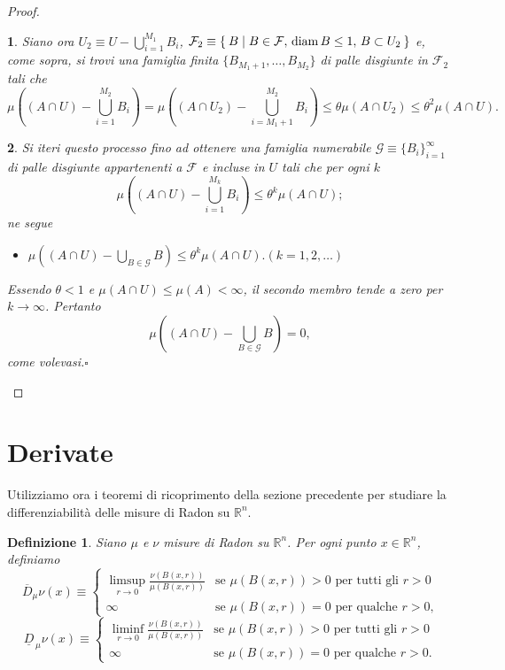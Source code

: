 \documentclass[a4paper,10pt,openright,oneside]{book}
\theoremstyle{theoremstyle}
\theoremstyle{theoremstylewoheader}
\theoremstyle{theoremstyle}
\newtheorem{definizione}[teorema]{Definizione}
\theoremstyle{proofsecstyle}
\newtheorem{proofsec}{}
\theoremstyle{nonumberplain}
\newtheorem{proof}{Dim.}
\newcommand{\FF}{\ensuremath{\mathcal{F}}}
\newcommand{\GG}{\ensuremath{\mathcal{G}}}
\newcommand{\RR}{\ensuremath{\mathbb{R}}}
\newcommand{\lDer}[2]{\ensuremath{\underline{D}_{\,#2} #1}}
\newcommand{\uDer}[2]{\ensuremath{\overline{D}_#2 #1}}
\DeclareMathOperator{\diam}{diam}
\renewcommand{\qedsymbol}{\ensuremath{\square}}
\newcommand{\qed}{\unskip\nobreak\hfill\nobreak\hspace{.5em}\qedsymbol}
\newcommand{\mymath}[2]{\begin{itemize}%
  \item[]\hfill\hbox{}\ensuremath{\displaystyle #1}\hfill\ensuremath{\displaystyle #2}%
  \end{itemize}}
\begin{document}
\begin{proof}
\begin{proofsec}
Siano ora $U_2 \equiv U - \bigcup_{i=1}^{M_1} B_i$, $\FF_2 \equiv \Set{ B | B \in \FF,\, \diam B \le 1,\, B \subset U_2 }$ e, come sopra, si trovi una famiglia finita $\{B_{M_1 + 1}, \ldots, B_{M_2}\}$ di palle disgiunte in $\FF_2$ tali che
\[
\mu\left((A \cap U) - \bigcup_{i=1}^{M_2} B_i\right) = \mu\left((A \cap U_2) - \bigcup_{i=M_1 + 1}^{M_2} B_i\right) \le \theta\mu(A \cap U_2) \le \theta^2\mu(A \cap U).
\]
\end{proofsec}

\begin{proofsec}
Si iteri questo processo fino ad ottenere una famiglia numerabile $\GG \equiv \{B_i\}_{i=1}^\infty$ di palle disgiunte appartenenti a $\FF$ e incluse in $U$ tali che per ogni $k$
\[
\mu\left((A \cap U) - \bigcup_{i=1}^{M_k} B_i\right) \le \theta^k\mu(A \cap U);
\]
ne segue \mymath{\mu\left((A \cap U) - \bigcup_{B \in \GG} B\right) \le \theta^k\mu(A \cap U).}{(k = 1, 2, \ldots)} Essendo $\theta < 1$ e $\mu(A \cap U) \le \mu(A) < \infty$, il secondo membro tende a zero per $k \to \infty$. Pertanto
\[
\mu\left((A \cap U) - \bigcup_{B \in \GG} B\right) = 0,
\]
come volevasi.\qed
\end{proofsec}
\end{proof}

\section{Derivate}

Utilizziamo ora i teoremi di ricoprimento della sezione precedente per studiare la differenziabilità delle misure di Radon su $\RR^n$.

\begin{definizione}
\label{def:derivate_di_misure}
Siano $\mu$ e $\nu$ misure di Radon su $\RR^n$. Per ogni punto $x \in \RR^n$, definiamo
\[
\uDer{\nu}{\mu} (x) \equiv \begin{cases}
\displaystyle\limsup_{r \to 0} \frac{\nu(B(x,r))}{\mu(B(x,r))} & \text{se $\mu(B(x,r)) > 0$ per tutti gli $r > 0$}\\
\infty & \text{se $\mu(B(x,r)) = 0$ per qualche $r > 0$,}
\end{cases}
\]
\[
\lDer{\nu}{\mu} (x) \equiv \begin{cases}
\displaystyle\liminf_{r \to 0} \frac{\nu(B(x,r))}{\mu(B(x,r))} & \text{se $\mu(B(x,r)) > 0$ per tutti gli $r > 0$}\\
\infty & \text{se $\mu(B(x,r)) = 0$ per qualche $r > 0$.}
\end{cases}
\]
\end{definizione}
\end{document}
